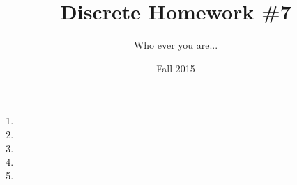 \documentclass[]{report}
\title{Discrete Homework \#7}
\author{Who ever you are...}
\date{Fall 2015}
\begin{document}
\maketitle

\begin{enumerate}
	\item \newpage
	\item 
	\item \newpage
	\item 
	\item 
\end{enumerate}
\end{document}

